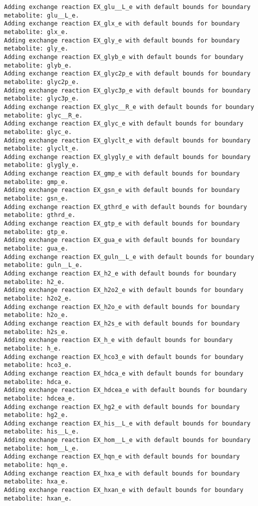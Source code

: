 \documentclass[
  letterpaper,
  DIV=11,
  numbers=noendperiod]{scrartcl}
\begin{document}
\begin{verbatim}
Adding exchange reaction EX_glu__L_e with default bounds for boundary metabolite: glu__L_e.
Adding exchange reaction EX_glx_e with default bounds for boundary metabolite: glx_e.
Adding exchange reaction EX_gly_e with default bounds for boundary metabolite: gly_e.
Adding exchange reaction EX_glyb_e with default bounds for boundary metabolite: glyb_e.
Adding exchange reaction EX_glyc2p_e with default bounds for boundary metabolite: glyc2p_e.
Adding exchange reaction EX_glyc3p_e with default bounds for boundary metabolite: glyc3p_e.
Adding exchange reaction EX_glyc__R_e with default bounds for boundary metabolite: glyc__R_e.
Adding exchange reaction EX_glyc_e with default bounds for boundary metabolite: glyc_e.
Adding exchange reaction EX_glyclt_e with default bounds for boundary metabolite: glyclt_e.
Adding exchange reaction EX_glygly_e with default bounds for boundary metabolite: glygly_e.
Adding exchange reaction EX_gmp_e with default bounds for boundary metabolite: gmp_e.
Adding exchange reaction EX_gsn_e with default bounds for boundary metabolite: gsn_e.
Adding exchange reaction EX_gthrd_e with default bounds for boundary metabolite: gthrd_e.
Adding exchange reaction EX_gtp_e with default bounds for boundary metabolite: gtp_e.
Adding exchange reaction EX_gua_e with default bounds for boundary metabolite: gua_e.
Adding exchange reaction EX_guln__L_e with default bounds for boundary metabolite: guln__L_e.
Adding exchange reaction EX_h2_e with default bounds for boundary metabolite: h2_e.
Adding exchange reaction EX_h2o2_e with default bounds for boundary metabolite: h2o2_e.
Adding exchange reaction EX_h2o_e with default bounds for boundary metabolite: h2o_e.
Adding exchange reaction EX_h2s_e with default bounds for boundary metabolite: h2s_e.
Adding exchange reaction EX_h_e with default bounds for boundary metabolite: h_e.
Adding exchange reaction EX_hco3_e with default bounds for boundary metabolite: hco3_e.
Adding exchange reaction EX_hdca_e with default bounds for boundary metabolite: hdca_e.
Adding exchange reaction EX_hdcea_e with default bounds for boundary metabolite: hdcea_e.
Adding exchange reaction EX_hg2_e with default bounds for boundary metabolite: hg2_e.
Adding exchange reaction EX_his__L_e with default bounds for boundary metabolite: his__L_e.
Adding exchange reaction EX_hom__L_e with default bounds for boundary metabolite: hom__L_e.
Adding exchange reaction EX_hqn_e with default bounds for boundary metabolite: hqn_e.
Adding exchange reaction EX_hxa_e with default bounds for boundary metabolite: hxa_e.
Adding exchange reaction EX_hxan_e with default bounds for boundary metabolite: hxan_e.

\end{verbatim}
\end{document}
